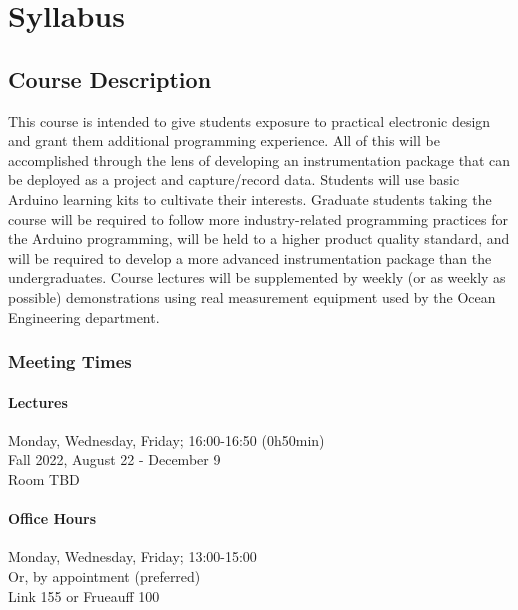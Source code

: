 %

\chapter{Syllabus} 

\section*{Course Description} 
This course is intended to give students exposure to practical electronic design and grant them additional programming experience. 
All of this will be accomplished through the lens of developing an instrumentation package that can be deployed as a project and capture/record data. 
Students will use basic Arduino learning kits to cultivate their interests. 
Graduate students taking the course will be required to follow more industry-related programming practices for the Arduino programming, will be held to a higher product quality standard, and will be required to develop a more advanced instrumentation package than the undergraduates. 
Course lectures will be supplemented by weekly (or as weekly as possible) demonstrations using real measurement equipment used by the Ocean Engineering department.

    \subsection*{Meeting Times}
        \subsubsection*{Lectures}
        Monday, Wednesday, Friday; 16:00-16:50 (0h50min)\\
        Fall 2022, August 22 - December 9\\
        Room TBD

        \subsubsection*{Office Hours}
        Monday, Wednesday, Friday; 13:00-15:00\\
        Or, by appointment (preferred)\\
        Link 155 or Frueauff 100

